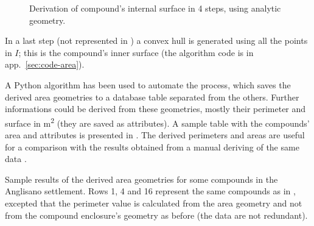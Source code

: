 \begin{figure}[H]

                \caption[Derivation of compound's internal surface using analytic geometry]{Derivation of compound's internal surface in 4 steps, using analytic geometry.}
                \label{fig:comp-iter}
            \end{figure}
            
            In a last step (not represented in ) a convex hull is generated using all the points in $I$; this is the compound's inner surface (the algorithm code is in app.~\ref{sec:code-area}).

            A Python algorithm has been used to automate the process, which saves the derived area geometries to a database table separated from the others. Further informations could be derived from these geometries, mostly their perimeter and surface in \si{\meter\squared} (they are saved as attributes). A sample table with the compounds' area and attributes is presented in . The derived perimeters and areas are useful for a comparison with the results obtained from a manual deriving of the same data \cite{laterza}.

            \begin{table}[!htb]
                \centering
                
                \caption[Sample results of area geometries derived from compounds and their attributes for the Anglisano settlement]{Sample results of the derived area geometries for some compounds in the Anglisano settlement. Rows 1, 4 and 16 represent the same compounds as in , excepted that the perimeter value is calculated from the area geometry and not from the compound enclosure's geometry as before (the data are not redundant).}
                \label{tab:tab-area-anglisano}
            \end{table}


